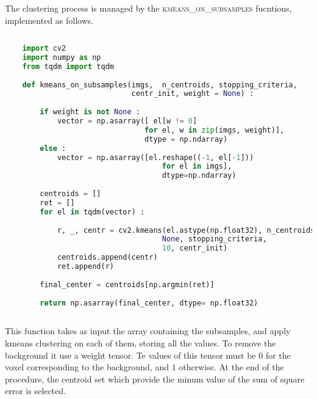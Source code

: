 \documentclass{standalone}
\begin{document}
	The clustering process is managed by the \textsc{kmeans\_on\_subsamples} fucntions, implemented as follows. 
	\lstset{style=python}
	\begin{lstlisting}[language=python, caption=kmenas\_on\_subsamples, label=code:kmeans]
		
	import cv2
	import numpy as np
	from tqdm import tqdm
		
	def kmeans_on_subsamples(imgs,  n_centroids, stopping_criteria, 
							 centr_init, weight = None) :
		
		if weight is not None :
			vector = np.asarray([ el[w != 0] 
								for el, w in zip(imgs, weight)], 
								dtype = np.ndarray)
		else :
			vector = np.asarray([el.reshape((-1, el[-1])) 
									for el in imgs], 
									dtype=np.ndarray)
		
		centroids = []
		ret = []
		for el in tqdm(vector) :
		
			r, _, centr = cv2.kmeans(el.astype(np.float32), n_centroids, 
									None, stopping_criteria, 
									10, centr_init)				
			centroids.append(centr)
			ret.append(r)
			
		final_center = centroids[np.argmin(ret)]
		
		return np.asarray(final_center, dtype= np.float32)
		
	\end{lstlisting}


	This function takes as input the array containing the subsamples, and apply kmeans clustering on each of them, storing all the values.
	To remove the background it use a weight tensor. Te values of this tensor must be $0$ for the voxel corresponding to the background, and $1$ otherwise. 
	At the end of the procedure, the centroid set which provide the minum value of the sum of square error is selected.



	
	
	
\end{document}
